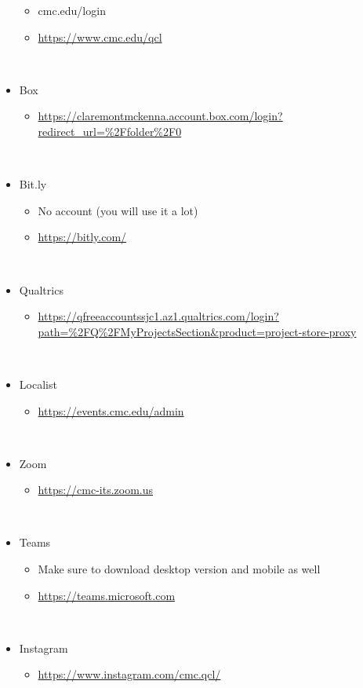 \documentclass[
]{book}
\providecommand{\tightlist}{%
  \setlength{\itemsep}{0pt}\setlength{\parskip}{0pt}}
\begin{document}
\begin{itemize}
  \begin{itemize}
  \tightlist
  \item
    cmc.edu/login\\
  \item
    \url{https://www.cmc.edu/qcl}\strut \\
  \end{itemize}
\item
  Box

  \begin{itemize}
  \tightlist
  \item
    \url{https://claremontmckenna.account.box.com/login?redirect_url=\%2Ffolder\%2F0}\strut \\
  \end{itemize}
\item
  Bit.ly

  \begin{itemize}
  \tightlist
  \item
    No account (you will use it a lot)\\
  \item
    \url{https://bitly.com/}\strut \\
  \end{itemize}
\item
  Qualtrics

  \begin{itemize}
  \tightlist
  \item
    \url{https://qfreeaccountssjc1.az1.qualtrics.com/login?path=\%2FQ\%2FMyProjectsSection\&product=project-store-proxy}\strut \\
  \end{itemize}
\item
  Localist

  \begin{itemize}
  \tightlist
  \item
    \url{https://events.cmc.edu/admin}\strut \\
  \end{itemize}
\item
  Zoom

  \begin{itemize}
  \tightlist
  \item
    \url{https://cmc-its.zoom.us}\strut \\
  \end{itemize}
\item
  Teams

  \begin{itemize}
  \tightlist
  \item
    Make sure to download desktop version and mobile as well\\
  \item
    \url{https://teams.microsoft.com}\strut \\
  \end{itemize}
\item
  Instagram

  \begin{itemize}
  \tightlist
  \item
    \url{https://www.instagram.com/cmc.qcl/}
  \end{itemize}
\end{itemize}
\end{document}

